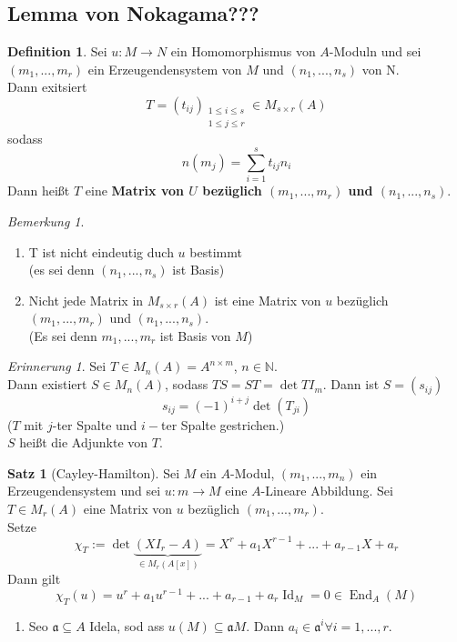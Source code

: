 \documentclass[10pt,a4paper]{article}
\newcommand{\N}{\ensuremath{\mathbb{N}}}
\newcounter{thm}[section]
\theoremstyle{definition}
\newtheorem{definition}[thm]{Definition}
\newtheorem{satz}[thm]{Satz}
\theoremstyle{plain}
\theoremstyle{remark}
\newtheorem{bem}[thm]{Bemerkung}
\newtheorem{rem}[thm]{Erinnerung}
\begin{document}
\subsection{Lemma von Nokagama???}
\begin{definition}
	Sei $u:M\rightarrow N$ ein Homomorphismus von $A$-Moduln und sei $(m_1,...,m_r)$ ein Erzeugendensystem von $M$ und $(n_1,...,n_s)$ von N.\\
	Dann exitsiert
	\[T=(t_{ij})_{\substack{1\le i\le s\\ 1\le j\le r}}\in M_{s\times r}(A)\]
	sodass
	\[n(m_j)=\sum_{i=1}^{s}t_{ij}n_i\]
	Dann heißt $T$ eine \textbf{Matrix von $U$ bezüglich $(m_1,...,m_r)$ und $(n_1,...,n_s)$}.
\end{definition}
\begin{bem}
	\begin{enumerate}
		\item T ist nicht eindeutig duch $u$ bestimmt\\
		(es sei denn $(n_1,...,n_s)$ ist Basis)
		\item Nicht jede Matrix in $M_{s\times r}(A)$ ist eine Matrix von $u$ bezüglich $(m_1,...,m_r)$ und $(n_1,...,n_s)$.\\
		(Es sei denn $m_1,...,m_r$ ist Basis von $M$)
	\end{enumerate}
\end{bem}
\begin{rem}
	Sei $T\in M_n(A)=A^{n\times m}$, $n\in \N$.\\
	Dann existiert $S\in M_n(A)$, sodass $TS=ST=\det TI_m$. Dann ist $S=(s_{ij})$
	\[s_{ij}=(-1)^{i+j}\det(T_{ji})\]
	($T$ mit $j$-ter Spalte und $i-$ter Spalte gestrichen.)\\
	$S$ heißt die Adjunkte von $T$.
\end{rem}
\begin{satz}[Cayley-Hamilton]
	\label{423CayHam}
	Sei $M$ ein $A$-Modul, $(m_1,...,m_n)$ ein Erzeugendensystem und sei $u:m\rightarrow M$ eine $A$-Lineare Abbildung. Sei $T\in M_r(A)$ eine Matrix von $u$ bezüglich $(m_1,...,m_r)$.\\
	Setze
	\[\chi_T:=\det\underbrace{(X I_r-A)}_{\in M_r(A[x])}=X^r+a_1X^{r-1}+...+a_{r-1}X+a_r\]
	Dann gilt
	\[\chi_T(u)=u^r+a_1u^{r-1}+...+a_{r-1}+a_r\operatorname{Id}_M=0\in\operatorname{End}_A(M)\]
	\begin{enumerate}
		\item Seo $\mathfrak a\subseteq A$ Idela, sod ass $u(M)\subseteq\mathfrak aM$. Dann $a_i\in\mathfrak a^i\forall i=1,...,r$.
	\end{enumerate}
\end{satz}
\end{document}
